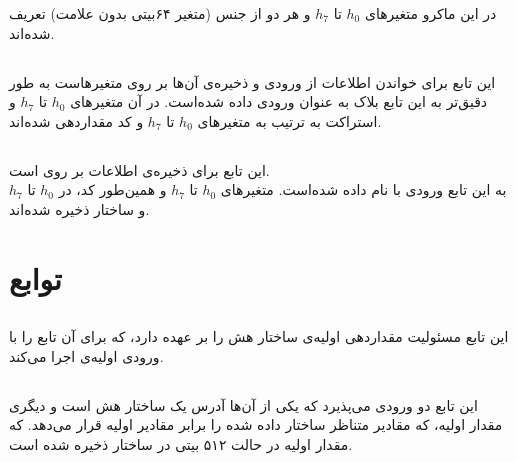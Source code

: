 در این ماکرو متغیرهای ‌$ h_0 $ تا $ h_7 $ و  هر دو از جنس (متغیر ۶۴بیتی بدون علامت) تعریف شده‌اند. 


\subsection{} 
\label{subsec:READ-STATE-BIG}


این تابع برای خواندن اطلاعات از ورودی و ذخیره‌ی ‌‌آن‌ها بر روی متغیرهاست به طور دقیق‌تر  به این تابع ‌بلاک  به عنوان ورودی داده شده‌است. در آن متغیرهای $ h_0 $ تا $ h_7 $ و  استراکت به ترتیب به متغیرهای ‌$ h_0 $ تا $ h_7 $ و  کد مقداردهی شده‌اند.

\subsection{} 
\label{subsec:WRITE-STATE-BIG}


این تابع برای ذخیره‌ی اطلاعات بر روی  است.\\
به این تابع ورودی   با نام  داده شده‌است. متغیرهای $ h_0 $ تا $ h_7 $ و همین‌طور  کد، در $ h_0 $  تا  $ h_ 7 $ و   ساختار
ذخیره شده‌اند.

\section{ توابع}

\subsection{}
\label{subsec:sph-skein512-init}
این تابع مسئولیت مقداردهی اولیه‌ی ساختار هش را بر عهده دارد، که برای آن تابع \hyperref[subsec:skein-big-init]{} را با ورودی‌ اولیه‌ی  اجرا می‌کند.
\subsection{}
\label{subsec:skein-big-init}

این تابع دو ورودی می‌پذیرد که یکی از آن‌ها آدرس یک ساختار هش است و دیگری مقدار اولیه، که مقادیر متناظر ساختار داده شده را برابر مقادیر اولیه قرار می‌دهد.
که مقدار اولیه در حالت ۵۱۲ بیتی در ساختار  ذخیره شده ‌است.

\subsection{}
\label{subsec:sph-skein512}

